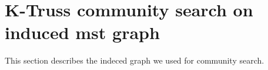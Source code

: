 \section{K-Truss community search on induced mst graph}
\label{induced_graph}

This section describes the indeced graph we used for community search. 

